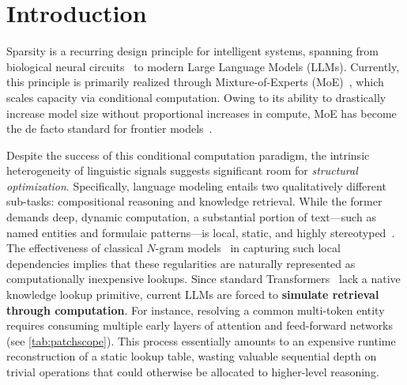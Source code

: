 \section{Introduction}
\label{sec:intro}
Sparsity is a recurring design principle for intelligent systems, spanning from biological neural circuits~\citep{olshausen1997sparse,lennie2003cost} to modern Large Language Models (LLMs). Currently, this principle is primarily realized through Mixture-of-Experts (MoE)~\citep{shazeer2017outrageously,dai2024deepseekmoe}, which scales capacity via conditional computation. 
Owing to its ability to drastically increase model size without proportional increases in compute, MoE has become the de facto standard for frontier models~\citep{guo2025deepseek,comanici2025gemini,kimi-k2}.


Despite the success of this conditional computation paradigm, the intrinsic heterogeneity of linguistic signals suggests significant room for \textit{structural optimization}. Specifically, language modeling entails two qualitatively different sub-tasks: compositional reasoning and knowledge retrieval. While the former demands deep, dynamic computation, a substantial portion of text—such as named entities and formulaic patterns—is local, static, and highly stereotyped~\citep{erman2000idiom,constant2017survey}. The effectiveness of classical $N$-gram models~\citep{liu2024infini,nguyen2024understanding,brants-etal-2007-large} in capturing such local dependencies implies that these regularities are naturally represented as computationally inexpensive lookups. Since standard Transformers~\citep{vaswani2017attention} lack a native knowledge lookup primitive, current LLMs are forced to \textbf{simulate retrieval through computation}. For instance, resolving a common multi-token entity requires consuming multiple early layers of attention and feed-forward networks~\citep{ghandeharioun2024patchscopes,DBLP:conf/coling/JinYHZWH0MMDYDZ25} (see \autoref{tab:patchscope}). This process essentially amounts to an expensive runtime reconstruction of a static lookup table, wasting valuable sequential depth on trivial operations that could otherwise be allocated to higher-level reasoning.

